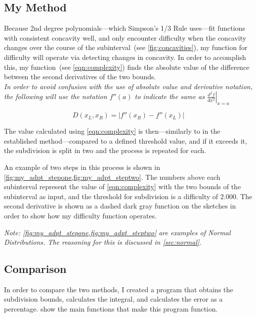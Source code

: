 \documentclass{paper}
\begin{document}
\subsection{My Method}
\label{sec:my_method}
Because 2nd degree polynomials---which Simpson's 1/3 Rule uses---fit functions with consistent concavity well, and only encounter difficulty when the concavity changes over the course of the subinterval~(see \cref{fig:concavities}), my function for difficulty will operate via detecting changes in concavity.
In order to accomplish this, my function~(see \cref{eqn:complexity}) finds the absolute value of the difference between the second derivatives of the two bounds.\\
\emph{In order to avoid confusion with the use of absolute value and derivative notation, the following will use the notation \(f''(a)\) to indicate the same as \(\left.\frac{d^2f}{dx^2}\right|_{x=a}\)}



\begin{equation}
    \label{eqn:complexity}
    D(x_L, x_R) = \left|f''(x_R) - f''(x_L)\right|
\end{equation}

The value calculated using \cref{eqn:complexity} is then---similarly to in the established method---compared to a defined threshold value, and if it exceeds it, the subdivision is split in two and the process is repeated for each.

An example of two steps in this process is shown in \cref{fig:my_adpt_stepone,fig:my_adpt_steptwo}.
The numbers above each subinterval represent the value of \cref{eqn:complexity} with the two bounds of the subinterval as input, and the threshold for subdivision is a difficulty of \(2.000\).
The second derivative is shown as a dashed dark gray function on the sketches in order to show how my difficulty function operates.

\emph{
Note: \cref{fig:my_adpt_stepone,fig:my_adpt_steptwo} are examples of Normal Distributions.
The reasoning for this is discussed in \cref{sec:normal}.
}





\subsection{Comparison}
\label{sec:comparison}
In order to compare the two methods, I created a program that obtains the subdivision bounds, calculates the integral, and calculates the error as a percentage.
 show the main functions that make this program function.
\end{document}
